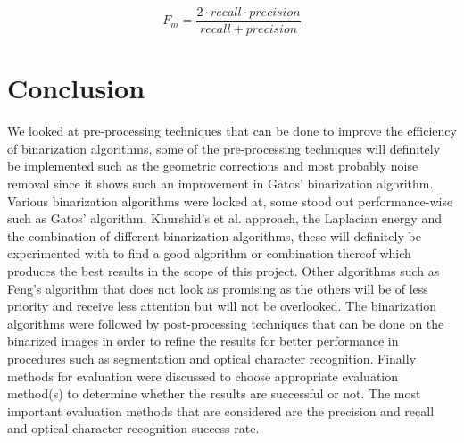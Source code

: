 \documentclass[11pt]{article}
\begin{document}
			\begin{large}
			\begin{equation} \label{eq:Fmeasure}
			 F_m = \frac{2 \cdot recall \cdot precision}{recall + precision}
			\end{equation}
			\end{large}


    \section{Conclusion}
		We looked at pre-processing techniques that can be done to improve the efficiency of binarization algorithms, some of the pre-processing techniques will definitely be implemented such as the geometric corrections and most probably noise removal since it shows such an improvement in Gatos' binarization algorithm. Various binarization algorithms were looked at, some stood out performance-wise such as Gatos' algorithm, Khurshid's et al. approach, the Laplacian energy and the combination of different binarization algorithms, these will definitely be experimented with to find a good algorithm or combination thereof which produces the best results in the scope of this project. Other algorithms such as Feng's algorithm that does not look as promising as the others will be of less priority and receive less attention but will not be overlooked. The binarization algorithms were followed by post-processing techniques that can be done on the binarized images in order to refine the results for better performance in procedures such as segmentation and optical character recognition. Finally methods for evaluation were discussed to choose appropriate evaluation method(s) to determine whether the results are successful or not. The most important evaluation methods that are considered are the precision and recall and optical character recognition success rate.

  \newpage
    
    
    \thispagestyle{plain}
    \clearpage
\end{document}
